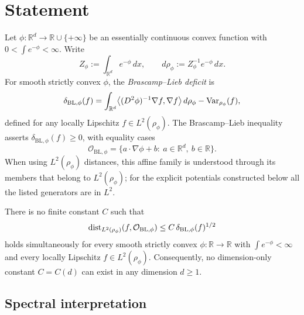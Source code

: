 \section{Statement}

Let $\phi:\mathbb R^d\to\mathbb R\cup\{+\infty\}$ be an essentially continuous
convex function with $0<\int e^{-\phi}<\infty$. Write
\[
  Z_\phi := \int_{\mathbb R^d} e^{-\phi}\,dx, \qquad
  d\rho_\phi := Z_\phi^{-1}e^{-\phi}\,dx.
\]
For smooth strictly convex $\phi$, the \emph{Brascamp--Lieb deficit} is
\[
  \delta_{\mathrm{BL},\phi}(f)
  =
  \int_{\mathbb R^d}\bigl\langle (D^2\phi)^{-1}\nabla f,\nabla f\bigr\rangle\,d\rho_\phi
  -\operatorname{Var}_{\rho_\phi}(f),
\]
defined for any locally Lipschitz $f\in L^2(\rho_\phi)$. The
Brascamp--Lieb inequality \cite{BL76} asserts $\delta_{\mathrm{BL},\phi}(f)\ge 0$,
with equality cases
\[
  \mathcal O_{\mathrm{BL},\phi}
  =
  \{a\cdot \nabla\phi+b:\ a\in\mathbb R^d,\ b\in\mathbb R\}.
\]
When using $L^2(\rho_\phi)$ distances, this affine family is understood through
its members that belong to $L^2(\rho_\phi)$; for the explicit potentials
constructed below all the listed generators are in $L^2$.

\begin{theorem}\label{thm:l2-fails}
There is no finite constant $C$ such that
\begin{equation}\label{eq:would-be-stability}
  \operatorname{dist}_{L^2(\rho_\phi)}(f,\mathcal O_{\mathrm{BL},\phi})
  \le C\,\delta_{\mathrm{BL},\phi}(f)^{1/2}
\end{equation}
holds simultaneously for every smooth strictly convex
$\phi:\mathbb R\to\mathbb R$ with $\int e^{-\phi}<\infty$ and every locally
Lipschitz $f\in L^2(\rho_\phi)$. Consequently, no dimension-only constant
$C=C(d)$ can exist in any dimension $d\ge 1$.
\end{theorem}

\subsection*{Spectral interpretation}

